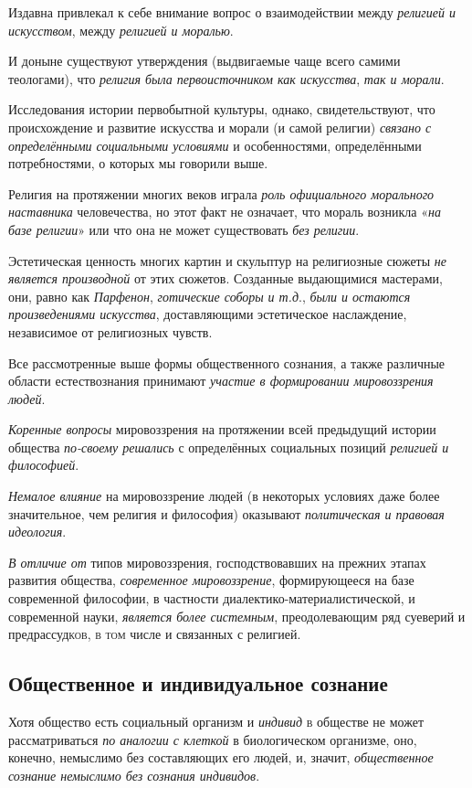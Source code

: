 \documentclass[a4paper,14pt,russian]{extreport}
\begin{document}
Издавна привлекал к себе внимание вопрос о взаимодействии между \emph{религией и искусством}, между \emph{религией и моралью}.

И доныне существуют утверждения (выдвигаемые чаще всего самими теологами), что \emph{религия была первоисточником как искусства}, \emph{так и морали}.

Исследования истории первобытной культуры, однако, свидетельствуют, что происхождение и развитие искусства и морали (и самой религии) \emph{связано с определёнными социальными условиями} и особенностями, определёнными потребностями, о которых мы говорили выше.

Религия на протяжении многих веков играла \emph{роль официального морального наставника} человечества, но этот факт не означает, что мораль возникла «\emph{на базе религии}» или что она не может существовать \emph{без религии}.

Эстетическая ценность многих картин и скульптур на религиозные сюжеты \emph{не является производной} от этих сюжетов. Созданные выдающимися мастерами, они, равно как \emph{Парфенон}, \emph{готические соборы} \emph{и т.д}., \emph{были и остаются произведениями искусства}, доставляющими эстетическое наслаждение, независимое от религиозных чувств.

Все рассмотренные выше формы общественного сознания, а также различные области естествознания принимают \emph{участие в формировании мировоззрения людей}.

\emph{Коренные вопросы} мировоззрения на протяжении всей предыдущий истории общества \emph{по-своему решались} с определённых социальных позиций \emph{религией и философией}.

\emph{Немалое влияние} на мировоззрение людей (в некоторых условиях даже более значительное, чем религия и философия) оказывают \emph{политическая и правовая идеология}.

\emph{В отличие от} типов мировоззрения, господствовавших на прежних этапах развития общества, \emph{современное мировоззрение}, формирующееся на базе современной философии, в частности диалектико-материалистической, и современной науки, \emph{является более системным}, преодолевающим ряд суеверий и предрассуд\textsc{ков, в том} числе и связанных с религией.

\subsection{Общественное и индивидуальное сознание}

Хотя общество есть социальный организм и \emph{индивид} \textsc{в} обществе не может рассматриваться \emph{по аналогии с клеткой} в биологическом организме, оно, конечно, немыслимо без составляющих его людей, и, значит, \emph{общественное сознание немыслимо без сознания индивидов}.
\end{document}
